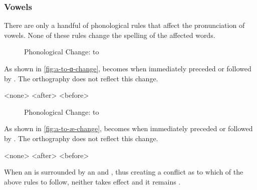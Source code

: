 
\subsubsection{Vowels}

There are only a handful of phonological rules that affect the pronunciation of \lang{} vowels. None of these rules change the spelling of the affected words.

\begin{figure}[h]\centering
	\caption{Phonological Change:  to }
	\label{fig:a-to-ɑ-change}
\end{figure}

As shown in \autoref{fig:a-to-ɑ-change},  becomes  when immediately preceded or followed by . The orthography does not reflect this change.

	\a<none>    
	\a<after>    
	\a<before>    
\xe

\begin{figure}[h]\centering
	\caption{Phonological Change:  to }
	\label{fig:a-to-æ-change}
\end{figure}

As shown in \autoref{fig:a-to-æ-change},  becomes  when immediately preceded or followed by . The orthography does not reflect this change.

	\a<none>    
	\a<after>    
	\a<before> \ljudge{\excl}    
\xe

When an  is surrounded by an  and , thus creating a conflict as to which of the above rules to follow, neither takes effect and it remains .

